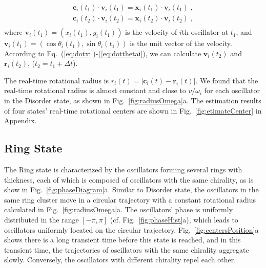 \documentclass[%
 aip,
 amsmath,amssymb,
 reprint,%
]{revtex4-1}
\begin{document}
\begin{equation}\label{eq:linearEquations}
    \begin{array}{c}
        \mathbf{c}_i\left( t_1 \right) \cdot \mathbf{v}_i\left( t_1 \right) =\mathbf{x}_i\left( t_1 \right) \cdot \mathbf{v}_i\left( t_1 \right)\;,\\
        \mathbf{c}_i\left( t_2 \right) \cdot \mathbf{v}_i\left( t_2 \right) =\mathbf{x}_i\left( t_2 \right) \cdot \mathbf{v}_i\left( t_2 \right)\;,\\
    \end{array}
\end{equation}
where $\mathbf{v}_i(t_1)=\left( x_i\left( t_1 \right) , y_i\left( t_1 \right) \right)$ is the velocity of $i$th oscillator at $t_1$, and $\mathbf{v}_i(t_1)=\left( \cos \theta _i\left( t_1 \right) , \sin \theta _i\left( t_1 \right) \right)$ is the unit vector of the velocity. According to Eq.~(\ref{eq:dotxi})-(\ref{eq:dotthetai}), we can calculate $\mathbf{v}_i(t_2)$ and $\mathbf{r}_i(t_2)$, ($t_2=t_1+\Delta t$). 

The real-time rotational radius is $r_i(t)=\left| \mathbf{c}_i(t)-\mathbf{r}_i(t) \right|$. We found that the real-time rotational radius is almost constant and close to $v/\omega_i$ for each oscillator in the Disorder state, as shown in Fig.~\ref{fig:radiusOmega}a. The estimation results of four states' real-time rotational centers are shown in Fig.~\ref{fig:etimateCenter} in Appendix.

\subsection{Ring State}

The Ring state is characterized by the oscillators forming several rings with thickness, each of which is composed of oscillators with the same chirality, as is show in Fig.~\ref{fig:phaseDiagram}a. 
Similar to Disorder state, the oscillators in the same ring cluster move in a circular trajectory with a constant rotational radius calculated in Fig.~\ref{fig:radiusOmega}a. 
The oscillators' phase is uniformly distributed in the range $\left[ -\pi,\pi \right]$ (cf. Fig.~\ref{fig:phaseHist}a), which leads to oscillators uniformly located on the circular trajectory.
Fig.~\ref{fig:centersPosition}a shows there is a long transient time before this state is reached, and in this transient time, the trajectories of oscillators with the same chirality aggregate slowly. Conversely, the oscillators with different chirality repel each other. 
\end{document}
